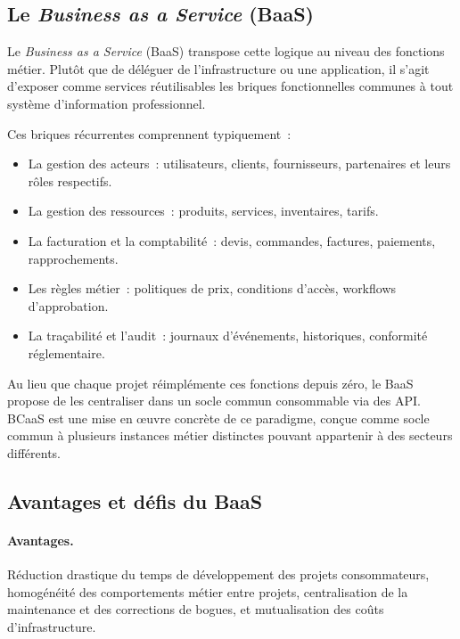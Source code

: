 \subsection{Le \textit{Business as a Service} (BaaS)}
\label{subsec:baas-def}

Le \textit{Business as a Service} (BaaS) transpose cette logique au niveau des fonctions
métier. Plutôt que de déléguer de l'infrastructure ou une application, il s'agit d'exposer
comme services réutilisables les briques fonctionnelles communes à tout système
d'information professionnel.

Ces briques récurrentes comprennent typiquement~:
\begin{itemize}
  \item La gestion des acteurs~: utilisateurs, clients, fournisseurs, partenaires et leurs
        rôles respectifs.
  \item La gestion des ressources~: produits, services, inventaires, tarifs.
  \item La facturation et la comptabilité~: devis, commandes, factures, paiements,
        rapprochements.
  \item Les règles métier~: politiques de prix, conditions d'accès, workflows
        d'approbation.
  \item La traçabilité et l'audit~: journaux d'événements, historiques, conformité
        réglementaire.
\end{itemize}

Au lieu que chaque projet réimplémente ces fonctions depuis zéro, le BaaS propose de les
centraliser dans un socle commun consommable via des API. BCaaS est une mise en œuvre
concrète de ce paradigme, conçue comme socle commun à plusieurs instances métier distinctes
pouvant appartenir à des secteurs différents.

\subsection{Avantages et défis du BaaS}
\label{subsec:baas-avantages}

\paragraph{Avantages.}
Réduction drastique du temps de développement des projets consommateurs, homogénéité des
comportements métier entre projets, centralisation de la maintenance et des corrections de
bogues, et mutualisation des coûts d'infrastructure.

